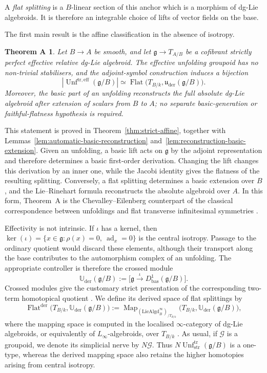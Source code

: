 \documentclass[11pt,reqno,a4paper,dvipsnames,x11names]{amsart}
\numberwithin{equation}{section}
\theoremstyle{plain}
\newtheorem*{theoremA}{Theorem A}
\theoremstyle{definition}
\theoremstyle{remark}
\DeclareMathOperator{\Unf}{Unf}
\DeclareMathOperator{\Flat}{Flat}
\DeclareMathOperator{\Map}{Map}
\newcommand{\kk}{k}
\newcommand{\g}{\mathfrak g}
\newcommand{\uuder}{\mathfrak u_{\mathrm{der}}}
\newcommand{\Uder}{\mathbb U_{\mathrm{der}}}
\newcommand{\xto}[1]{\xrightarrow{#1}}
\newcommand{\bas}{\mathrm{bas}}
\newcommand{\tr}{\mathrm{tr}}
\newcommand{\eff}{\mathrm{eff}}
\begin{document}
A \emph{flat splitting} is a \(B\)-linear section of this anchor which is a morphism of dg-Lie algebroids. It is therefore an integrable choice of lifts of vector fields on the base.

The first main result is the affine classification in the absence of isotropy.

\begin{theoremA} 
Let \(B\to A\) be smooth, and let \(\g\to T_{A/B}\) be a cofibrant strictly perfect effective relative dg-Lie algebroid. The effective unfolding groupoid has no non-trivial stabilisers, and the adjoint-symbol construction induces a bijection
\[
 \left|\Unf^{\tr,\eff}(\g/B)\right|
 \simeq
 \Flat\bigl(T_{B/\kk},\uuder(\g/B)\bigr).
\]
Moreover, the basic part of an unfolding reconstructs the full absolute dg-Lie algebroid after extension of scalars from \(B\) to \(A\); no separate basic-generation or faithful-flatness hypothesis is required.
\end{theoremA}

This statement is proved in Theorem~\ref{thm:strict-affine}, together with Lemmas~\ref{lem:automatic-basic-reconstruction} and~\ref{lem:reconstruction-basic-extension}. Given an unfolding, a basic lift acts on \(\g\) by the adjoint representation and therefore determines a basic first-order derivation. Changing the lift changes this derivation by an inner one, while the Jacobi identity gives the flatness of the resulting splitting. Conversely, a flat splitting determines a basic extension over \(B\), and the Lie--Rinehart formula reconstructs the absolute algebroid over \(A\). In this form, Theorem~A is the Chevalley--Eilenberg counterpart of the classical correspondence between unfoldings and flat transverse infinitesimal symmetries \cite{Suwa81,Suwa83,Quallbrunn,CMQ}.

\medskip
 
Effectivity is not intrinsic. If \(\iota\) has a kernel, then
$
 \ker(\iota)
 =\{x\in\g:\rho(x)=0,\ \operatorname{ad}_x=0\}
$
is the central isotropy. Passage to the ordinary quotient would discard these elements, although their transport along the base contributes to the automorphism complex of an unfolding. The appropriate controller is therefore the crossed module
\[
 \Uder(\g/B)
 :=\bigl[\g\xto{\iota}D^1_{\bas}(\g/B)\bigr].
\]
Crossed modules give the customary strict presentation of the corresponding two-term homotopical quotient \cite{BrownSpencer76,Noohi07}. We define its derived space of flat splittings by
\[
 \operatorname{Flat}^{\mathrm{der}}
 \bigl(T_{B/\kk},\Uder(\g/B)\bigr)
 :=
 \Map_{(\mathrm{LieAlgd}^{\infty}_{B})_{/T_{B/\kk}}}
 \bigl(T_{B/\kk},\Uder(\g/B)\bigr),
\]
where the mapping space is computed in the localised \(\infty\)-category of dg-Lie algebroids, or equivalently of \(L_\infty\)-algebroids, over \(T_{B/\kk}\) \cite{Hinich01,HAGII,Pridham10,Nuiten}. As usual, if \(\mathcal G\) is a groupoid, we denote its simplicial nerve by \(N\mathcal G\). Thus \(N\operatorname{Unf}^{\tr}_{\mathrm{str}}(\g/B)\) is a one-type, whereas the derived mapping space also retains the higher homotopies arising from central isotropy.
\end{document}
